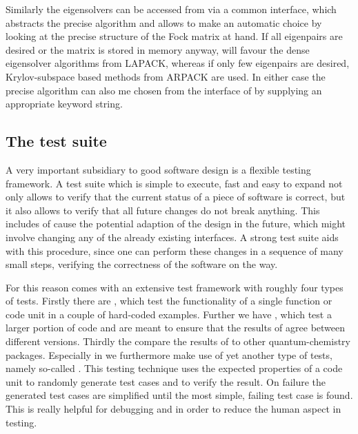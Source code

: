 Similarly the eigensolvers can be accessed from \gscf via a common interface,
which abstracts the precise algorithm and allows \lazyten to make an automatic
choice by looking at the precise structure of the Fock matrix at hand.
If all eigenpairs are desired or the matrix is stored in memory anyway,
\lazyten will favour the dense eigensolver algorithms from LAPACK,
whereas if only few eigenpairs are desired,
Krylov-subspace based methods from ARPACK are used.
In either case the precise algorithm can also me chosen from the \python interface
of \molsturm by supplying an appropriate keyword string.


%
%
\subsection{The \molsturm test suite}
A very important subsidiary to good software design is a flexible testing framework.
A test suite which is simple to execute, fast and easy to expand not only allows to verify
that the current status of a piece of software is correct,
but it also allows to verify that all future changes do not break anything.
This includes of cause the potential adaption of the design in the future,
which might involve changing any of the already existing interfaces.
A strong test suite aids with this procedure,
since one can perform these changes in a sequence of many small steps,
verifying the correctness of the software on the way.

For this reason \molsturm comes with an extensive test framework
with roughly four types of tests.
Firstly there are ,
which test the functionality of a single function or code unit in a couple of hard-coded examples.
Further we have ,
which test a larger portion of code and are meant to ensure that
the results of \molsturm agree between different versions.
Thirdly the  compare
the results of \molsturm to other quantum-chemistry packages.
Especially in \lazyten we furthermore make use of yet another type of tests,
namely so-called .
This testing technique uses the expected properties of a code unit
to randomly generate test cases and to verify the result.
On failure the generated test cases are simplified until the most simple,
failing test case is found.
This is really helpful for debugging and in order to reduce the human aspect in testing.

